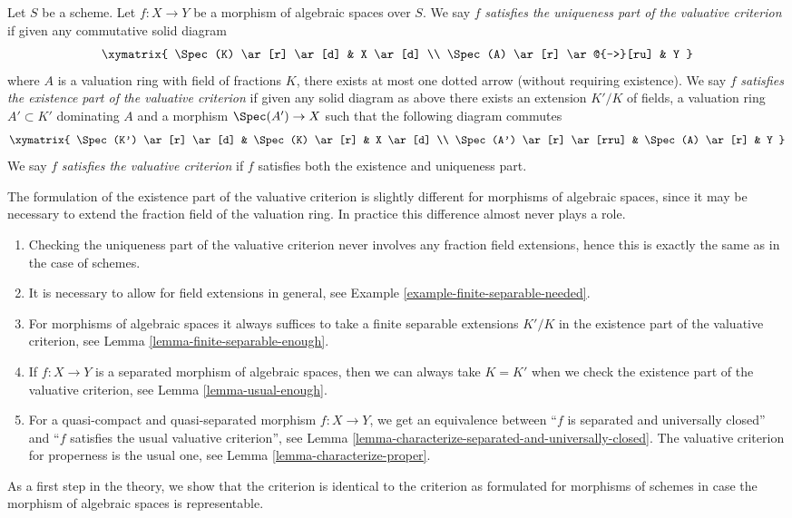 \begin{definition}
\label{definition-valuative-criterion}
Let $S$ be a scheme.
Let $f : X \to Y$ be a morphism of algebraic spaces over $S$.
We say $f$ {\it satisfies the uniqueness part of the valuative criterion}
if given any commutative solid diagram
$$
\xymatrix{
\Spec(K) \ar[r] \ar[d] & X \ar[d] \\
\Spec(A) \ar[r] \ar@{-->}[ru] & Y
}
$$
where $A$ is a valuation ring with field of fractions $K$, there exists
at most one dotted arrow (without requiring existence).
We say $f$ {\it satisfies the existence part of the valuative criterion}
if given any solid diagram as above there exists an extension
$K'/K$ of fields, a valuation ring $A' \subset K'$ dominating
$A$ and a morphism $\Spec(A') \to X$ such that the following
diagram commutes
$$
\xymatrix{
\Spec(K') \ar[r] \ar[d] & \Spec(K) \ar[r] & X \ar[d] \\
\Spec(A') \ar[r] \ar[rru] & \Spec(A) \ar[r] & Y
}
$$
We say $f$ {\it satisfies the valuative criterion}
if $f$ satisfies both the existence and uniqueness part.
\end{definition}

\noindent
The formulation of the existence part of the valuative criterion is
slightly different for morphisms of algebraic spaces, since it may be
necessary to extend the fraction field of the valuation ring.
In practice this difference almost never plays a role.
\begin{enumerate}
\item Checking the uniqueness part of the valuative criterion never
involves any fraction field extensions, hence this is exactly the same
as in the case of schemes.
\item It is necessary to allow for field extensions in general, see
Example \ref{example-finite-separable-needed}.
\item For morphisms of algebraic spaces it always suffices to
take a finite separable extensions $K'/K$ in the existence
part of the valuative criterion, see Lemma \ref{lemma-finite-separable-enough}.
\item If $f : X \to Y$ is a separated morphism of algebraic spaces, then
we can always take $K = K'$ when we check the existence part of the
valuative criterion, see Lemma \ref{lemma-usual-enough}.
\item For a quasi-compact and quasi-separated
morphism $f : X \to Y$, we get an equivalence between
``$f$ is separated and universally closed'' and ``$f$ satisfies
the usual valuative criterion'', see
Lemma \ref{lemma-characterize-separated-and-universally-closed}.
The valuative criterion for properness is the usual one, see
Lemma \ref{lemma-characterize-proper}.
\end{enumerate}
As a first step in the theory, we show that the criterion is identical
to the criterion as formulated for morphisms of schemes
in case the morphism of algebraic spaces is representable.

